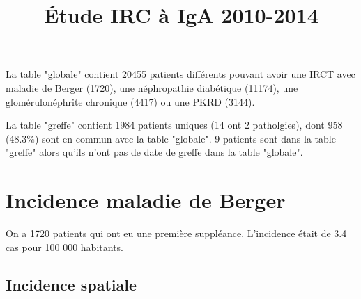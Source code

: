 \documentclass[11pt,a4paper]{article}\usepackage[]{graphicx}\usepackage[]{color}
\title{Étude IRC à IgA 2010-2014}
\begin{document}
\maketitle





La table "globale" contient 20455 patients différents pouvant avoir une IRCT avec maladie de Berger (1720), une néphropathie diabétique (11174), une glomérulonéphrite chronique (4417) ou une PKRD (3144).

La table "greffe" contient 1984 patients uniques (14 ont 2 patholgies), dont 958 (48.3\%) sont en commun avec la table "globale". 9 patients sont dans la table "greffe" alors qu'ils n'ont pas de date de greffe dans la table "globale".

\section{Incidence maladie de Berger}

On a 1720 patients qui ont eu une première suppléance. L'incidence était de 3.4 cas pour 100 000 habitants.

  \subsection{Incidence spatiale}
\end{document}
